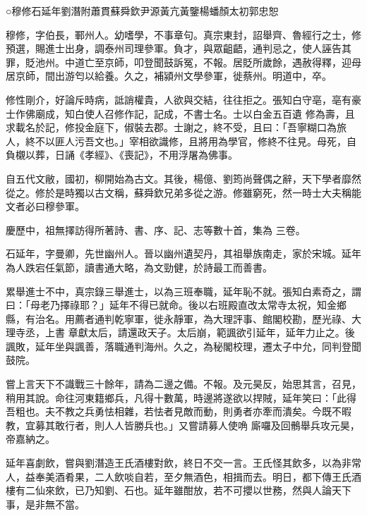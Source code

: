 
\begin{pinyinscope}

 ○穆修石延年劉潛附蕭貫蘇舜欽尹源黃亢黃鑒楊蟠顏太初郭忠恕



 穆修，字伯長，鄆州人。幼嗜學，不事章句。真宗東封，詔舉齊、魯經行之士，修預選，賜進士出身，調泰州司理參軍。負才，與眾齟齬，通判忌之，使人誣告其罪，貶池州。中道亡至京師，叩登聞鼓訴冤，不報。居貶所歲餘，遇赦得釋，迎母居京師，間出游匄以給養。久之，補潁州文學參軍，徙蔡州。明道中，卒。



 修性剛介，好論斥時病，詆誚權貴，人欲與交結，往往拒之。張知白守亳，亳有豪士作佛廟成，知白使人召修作記，記成，不書士名。士以白金五百遺
 修為壽，且求載名於記，修投金庭下，俶裝去郡。士謝之，終不受，且曰：「吾寧糊口為旅人，終不以匪人污吾文也。」宰相欲識修，且將用為學官，修終不往見。母死，自負櫬以葬，日誦《孝經》、《喪記》，不用浮屠為佛事。



 自五代文敝，國初，柳開始為古文。其後，楊億、劉筠尚聲偶之辭，天下學者靡然從之。修於是時獨以古文稱，蘇舜欽兄弟多從之游。修雖窮死，然一時士大夫稱能文者必曰穆參軍。



 慶歷中，祖無擇訪得所著詩、書、序、記、志等數十首，集為
 三卷。



 石延年，字曼卿，先世幽州人。晉以幽州遺契丹，其祖舉族南走，家於宋城。延年為人跌宕任氣節，讀書通大略，為文勁健，於詩最工而善書。



 累舉進士不中，真宗錄三舉進士，以為三班奉職，延年恥不就。張知白素奇之，謂曰：「母老乃擇祿耶？」延年不得已就命。後以右班殿直改太常寺太祝，知金鄉縣，有治名。用薦者通判乾寧軍，徙永靜軍，為大理評事、館閣校勘，歷光祿、大理寺丞，上書
 章獻太后，請還政天子。太后崩，範諷欲引延年，延年力止之。後諷敗，延年坐與諷善，落職通判海州。久之，為秘閣校理，遷太子中允，同判登聞鼓院。



 嘗上言天下不識戰三十餘年，請為二邊之備。不報。及元昊反，始思其言，召見，稍用其說。命往河東籍鄉兵，凡得十數萬，時邊將遂欲以捍賊，延年笑曰：「此得吾粗也。夫不教之兵勇怯相雜，若怯者見敵而動，則勇者亦牽而潰矣。今既不暇教，宜募其敢行者，則人人皆勝兵也。」又嘗請募人使唃
 廝囉及回鶻舉兵攻元昊，帝嘉納之。



 延年喜劇飲，嘗與劉潛造王氏酒樓對飲，終日不交一言。王氏怪其飲多，以為非常人，益奉美酒肴果，二人飲啖自若，至夕無酒色，相揖而去。明日，都下傳王氏酒樓有二仙來飲，已乃知劉、石也。延年雖酣放，若不可攖以世務，然與人論天下事，是非無不當。




\end{pinyinscope}
